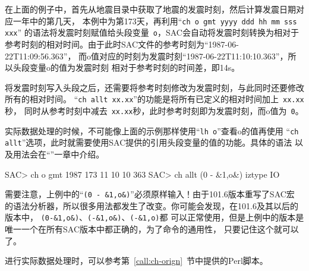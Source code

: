 在上面的例子中，首先从地震目录中获取了地震的发震时刻，然后计算发震日期对应一年中的第几天，
本例中为第173天，再利用``\verb+ch o gmt yyyy ddd hh mm sss xxx+''
的语法将发震时刻赋值给头段变量~\verb+o+，SAC会自动将发震时刻转换为相对于
参考时刻的相对时间。由于此时SAC文件的参考时刻为``1987-06-22T11:09:56.363''，
而o值对应的时刻为发震时刻``1987-06-22T11:10:10.363''，所以头段变量o的值为发震时刻
相对于参考时刻的时间差，即14s。

将发震时刻写入头段之后，还需要将参考时刻修改为发震时刻，与此同时还要修改所有的相对时间。
``\verb+ch allt xx.xx+''的功能是将所有已定义的相对时间加上~\verb+xx.xx+秒，
同时从参考时刻中减去~\verb+xx.xx+秒，此时参考时刻即为发震时刻，而o值为~\verb+0+。

实际数据处理的时候，不可能像上面的示例那样使用``\verb+lh o+''查看o的值再使用
``\verb+ch allt+''选项，此时就需要使用SAC提供的引用头段变量的值的功能。具体的语法
以及用法会在``''一章中介绍。

\begin{SACCode}
SAC> ch o gmt 1987 173 11 10 10 363
SAC> ch allt (0 - &1,o&) iztype IO
\end{SACCode}

需要注意，上例中的``\verb+(0 - &1,o&)+''必须原样输入！由于101.6版本重写了SAC宏
的语法分析器，所以很多用法都发生了改变。你可能会发现，在101.6及其以后的版本中，
\verb+(0-&1,o&)+、\verb+(-&1,o&)+、\verb+(-&1,o)+都
可以正常使用，但是上例中的版本是唯一一个在所有SAC版本中都正确的，为了命令的通用性，
只要记住这个就可以了。

进行实际数据处理时，可以参考第~\ref{call:ch-orign}~节中提供的Perl脚本。
